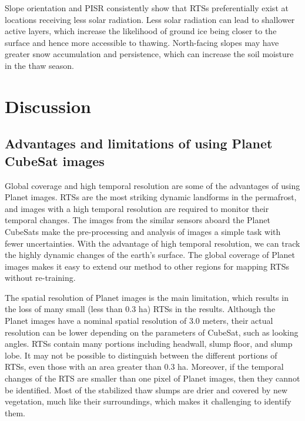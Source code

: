 \documentclass[authoryear,preprint,review,12pt]{elsarticle}
\begin{document}
Slope orientation and PISR consistently show that RTSs preferentially exist at locations receiving less solar radiation. Less solar radiation can lead to shallower active layers, which increase the likelihood of ground ice being closer to the surface and hence more accessible to thawing. North-facing slopes may have greater snow accumulation and persistence, which can increase the soil moisture in the thaw season. 


\section{Discussion}
\label{sec_discussion}

\subsection{Advantages and limitations of using Planet CubeSat images}
\label{subsec_advantage_limitation_planet}

Global coverage and high temporal resolution are some of the advantages of using Planet images. RTSs are the most striking dynamic landforms in the permafrost, and images with a high temporal resolution are required to monitor their temporal changes. The images from the similar sensors aboard the Planet CubeSats make the pre-processing and analysis of images a simple task with fewer uncertainties. With the advantage of high temporal resolution, we can track the highly dynamic changes of the earth's surface. 
The global coverage of Planet images makes it easy to extend our method to other regions for mapping RTSs without re-training. 

The spatial resolution of Planet images is the main limitation, which results in the loss of many small (less than 0.3 ha)  RTSs in the results. Although the Planet images have a nominal spatial resolution of 3.0 meters, their actual resolution can be lower depending on the parameters of CubeSat, such as looking angles.
RTSs contain many portions including headwall, slump floor, and slump lobe. It may not be possible to distinguish between the different portions of RTSs, even those with an area greater than 0.3 ha. Moreover, if the temporal changes of the RTS are smaller than one pixel of Planet images, then they cannot be identified. Most of the stabilized thaw slumps are drier and covered by new vegetation, much like their surroundings, which makes it challenging to identify them. 
\end{document}
